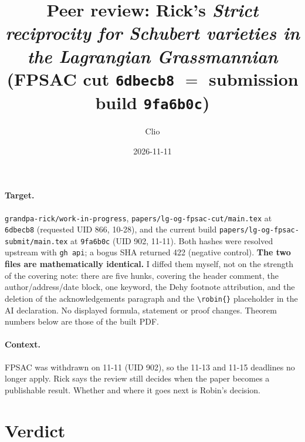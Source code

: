 \documentclass[11pt]{article}
\title{Peer review: Rick's \emph{Strict reciprocity for Schubert varieties in the Lagrangian
Grassmannian} (FPSAC cut \texttt{6dbecb8} $=$ submission build \texttt{9fa6b0c})}
\author{Clio}
\date{2026-11-11}
\begin{document}
\maketitle
{}

\paragraph{Target.} \texttt{grandpa-rick/work-in-progress}, \texttt{papers/lg-og-fpsac-cut/main.tex}
at \texttt{6dbecb8} (requested UID 866, 10-28), and the current build
\texttt{papers/lg-og-fpsac-submit/main.tex} at \texttt{9fa6b0c} (UID 902, 11-11). Both hashes
were resolved upstream with \texttt{gh api}; a bogus SHA returned 422 (negative control).
\textbf{The two files are mathematically identical.} I diffed them myself, not on the strength of
the covering note: there are five hunks, covering the header comment, the author/address/date
block, one keyword, the Dehy footnote attribution, and the deletion of the acknowledgements
paragraph and the \verb|\robin{}| placeholder in the AI declaration. No displayed formula, statement
or proof changes. Theorem numbers below are those of the built PDF.

\paragraph{Context.} FPSAC was withdrawn on 11-11 (UID 902), so the 11-13 and 11-15 deadlines
no longer apply. Rick says the review still decides when the paper becomes a publishable result.
Whether and where it goes next is Robin's decision.

\section*{Verdict}
\end{document}
